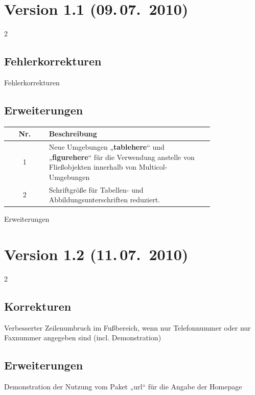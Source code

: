\documentclass[serifmath,a0paper,noDIN,Mathematik]{tudmathposter}
\begin{document}
\section{Version 1.1 (09.\,07.~2010)}
\begin{multicols}2
  \subsection{Fehlerkorrekturen}
 \begin{figurehere}
    \centerline{%
    }
    \caption{Fehlerkorrekturen}
  \end{figurehere}
  \subsection{Erweiterungen}
  \begin{tablehere}
    \centering
    \begin{farbtabellen}
      \begin{tabular}{||c|p{0.8\linewidth}||}
        \hline\hline
        Nr.&Beschreibung\\\hline\hline
        1&Neue Umgebungen „\textbf{tablehere}“ und „\textbf{figurehere}“ für die Verwendung
        anstelle von Fließobjekten innerhalb von Multicol-Umgebungen\\\hline
        2&Schriftgröße für Tabellen- und Abbildungsunterschriften reduziert.\\\hline
      \end{tabular}
    \end{farbtabellen}
    \caption{Erweiterungen}
  \end{tablehere}
\end{multicols}
\section{Version 1.2 (11.\,07.~2010)}
\begin{multicols}2
\subsection{Korrekturen}
Verbesserter Zeilenumbruch im Fußbereich, wenn nur Telefonnummer oder nur Faxnummer angegeben sind (incl. Demonstration)
\subsection{Erweiterungen}
Demonstration der Nutzung vom Paket „url“ für die Angabe der Homepage
\end{multicols}
\end{document}
